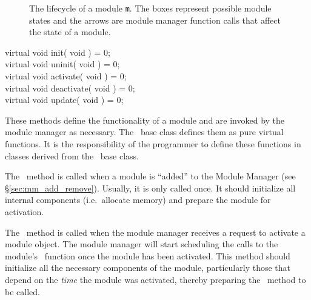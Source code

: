 \begin{figure}[ht]
  \begin{center}
    \caption{The lifecycle of a module {\tt m}. The boxes represent possible module
      states and the arrows are module manager function calls that affect
      the state of a module.}
    \label{fig:module_lifecycle}
  \end{center}
\end{figure}


\begin{prototype}
virtual void init( void ) = 0; \\
virtual void uninit( void ) = 0; \\
virtual void activate( void ) = 0; \\
virtual void deactivate( void ) = 0; \\
virtual void update( void ) = 0;
\end{prototype}

These methods define the functionality of a module and are invoked by the
module manager as necessary. The \Module\ base class defines them as pure
virtual functions. It is the responsibility of the programmer to define
these functions in classes derived from the \Module\ base class.

The \initFN\ method is called when a module is ``added'' to the Module
Manager (see \S\ref{sec:mm_add_remove}). Usually, it is only called once. It
should initialize all internal components (i.e.\ allocate memory) and
prepare the module for activation.

The \activateFN\ method is called when the module manager receives a request
to activate a module object. The module manager will start scheduling the
calls to the module's \updateFN\ function once the module has been activated. This
method should initialize all the necessary components of the module,
particularly those that depend on the {\it time} the module was activated,
thereby preparing the \updateFN\ method to be called.

